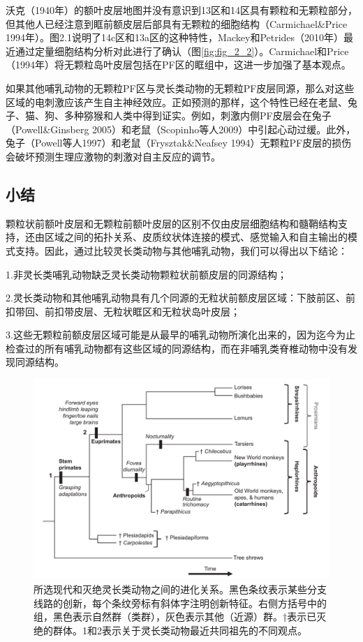 沃克（1940年）的额叶皮层地图并没有意识到13区和14区具有颗粒和无颗粒部分，但其他人已经注意到眶前额皮层后部具有无颗粒的细胞结构（Carmichael\&Price 1994年）。图2.1说明了14c区和13a区的这种特性，Mackey和Petrides（2010年）最近通过定量细胞结构分析对此进行了确认（图\ref{fig:fig_2_2}）。Carmichael和Price（1994年）将无颗粒岛叶皮层包括在PF区的眶组中，这进一步加强了基本观点。

如果其他哺乳动物的无颗粒PF区与灵长类动物的无颗粒PF皮层同源，那么对这些区域的电刺激应该产生自主神经效应。正如预测的那样，这个特性已经在老鼠、兔子、猫、狗、多种猕猴和人类中得到证实。例如，刺激内侧PF皮层会在兔子（Powell\&Ginsberg 2005）和老鼠（Scopinho等人2009）中引起心动过缓。此外，兔子（Powell等人1997）和老鼠（Frysztak\&Neafsey 1994）无颗粒PF皮层的损伤会破坏预测生理应激物的刺激对自主反应的调节。

\subsection{小结}
颗粒状前额叶皮层和无颗粒前额叶皮层的区别不仅由皮层细胞结构和髓鞘结构支持，还由区域之间的拓扑关系、皮质纹状体连接的模式、感觉输入和自主输出的模式支持。因此，通过比较灵长类动物与其他哺乳动物，我们可以得出以下结论：\par
1.非灵长类哺乳动物缺乏灵长类动物颗粒状前额皮层的同源结构；\par
2.灵长类动物和其他哺乳动物具有几个同源的无粒状前额皮层区域：下肢前区、前扣带回、前扣带皮层、无粒状眶区和无粒状岛叶皮层；\par
3.这些无颗粒前额皮层区域可能是从最早的哺乳动物所演化出来的，因为迄今为止检查过的所有哺乳动物都有这些区域的同源结构，而在非哺乳类脊椎动物中没有发现同源结构。

\begin{figure}[!htb]
	\centering
	\includegraphics[width=0.8\linewidth]{image_pfc/Fig_2_5}
	\caption{所选现代和灭绝灵长类动物之间的进化关系。黑色条纹表示某些分支线路的创新，每个条纹旁标有斜体字注明创新特征。右侧方括号中的组，黑色表示自然群（类群），灰色表示其他（近源）群。†表示已灭绝的群体。1和2表示关于灵长类动物最近共同祖先的不同观点。\label{fig:fig_2_5}}
\end{figure}

